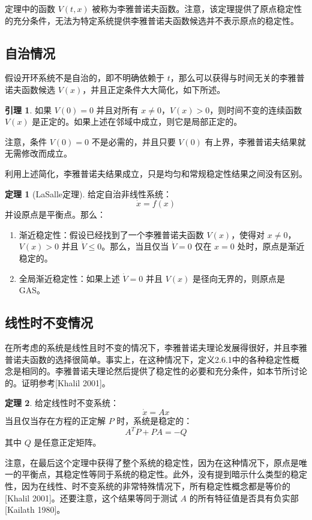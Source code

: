 \documentclass[UTF8,12pt,a4paper]{ctexart}
\theoremstyle{definition}
\newtheorem{theorem}{定理}[section]
\newtheorem{lemma}{引理}[section]
\begin{document}
定理中的函数 $V(t, x)$ 被称为李雅普诺夫函数。注意，该定理提供了原点稳定性的充分条件，无法为特定系统提供李雅普诺夫函数候选并不表示原点的稳定性。

\subsection{自治情况}

假设开环系统不是自治的，即不明确依赖于 $t$，那么可以获得与时间无关的李雅普诺夫函数候选 $V(x)$，并且正定条件大大简化，如下所述。

\begin{lemma}
如果 $V(0)=0$ 并且对所有 $x \neq 0$，$V(x) > 0$，则时间不变的连续函数 $V(x)$ 是正定的。如果上述在邻域中成立，则它是局部正定的。
\end{lemma}

注意，条件 $V(0)=0$ 不是必需的，并且只要 $V(0)$ 有上界，李雅普诺夫结果就无需修改而成立。

利用上述简化，李雅普诺夫结果成立，只是均匀和常规稳定性结果之间没有区别。

\begin{theorem}[LaSalle定理]
给定自治非线性系统：
\[
\dot{x} = f(x)
\]
并设原点是平衡点。那么：
\begin{enumerate}
\item 渐近稳定性：假设已经找到了一个李雅普诺夫函数 $V(x)$，使得对 $x \neq 0$，$V(x) > 0$ 并且 $\dot{V} \leq 0$。那么，当且仅当 $\dot{V}=0$ 仅在 $x=0$ 处时，原点是渐近稳定的。
\item 全局渐近稳定性：如果上述 $\dot{V}=0$ 并且 $V(x)$ 是径向无界的，则原点是GAS。
\end{enumerate}
\end{theorem}

\subsection{线性时不变情况}

在所考虑的系统是线性且时不变的情况下，李雅普诺夫理论发展得很好，并且李雅普诺夫函数的选择很简单。事实上，在这种情况下，定义2.6.1中的各种稳定性概念是相同的。李雅普诺夫理论然后提供了稳定性的必要和充分条件，如本节所讨论的。证明参考[Khalil 2001]。

\begin{theorem}
给定线性时不变系统：
\[
\dot{x} = Ax
\]
当且仅当存在方程的正定解 $P$ 时，系统是稳定的：
\[
A^T P + PA = -Q
\]
其中 $Q$ 是任意正定矩阵。
\end{theorem}

注意，在最后这个定理中获得了整个系统的稳定性，因为在这种情况下，原点是唯一的平衡点，其稳定性等同于系统的稳定性。此外，没有提到暗示什么类型的稳定性，因为在线性、时不变系统的非常特殊情况下，所有稳定性概念都是等价的[Khalil 2001]。还要注意，这个结果等同于测试 $A$ 的所有特征值是否具有负实部[Kailath 1980]。
\end{document}
